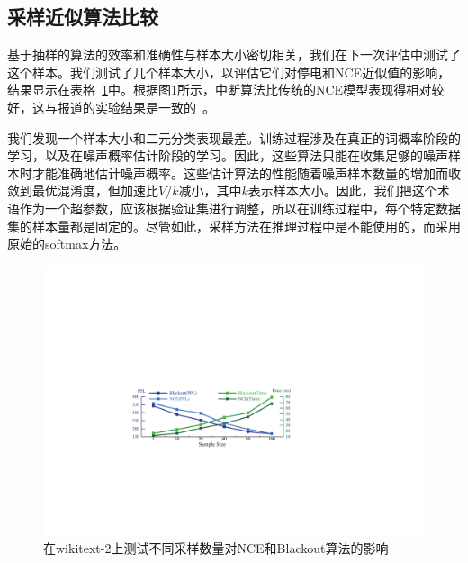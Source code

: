 \subsection{采样近似算法比较}

基于抽样的算法的效率和准确性与样本大小密切相关，我们在下一次评估中测试了这个样本。我们测试了几个样本大小，以评估它们对停电和NCE近似值的影响，结果显示在表格~\ref{fig:blackout_nce}中。根据图1所示，中断算法比传统的NCE模型表现得相对较好，这与报道的实验结果是一致的~\cite{DBLP:journals/iclr/JiVSAD15}。


我们发现一个样本大小和二元分类表现最差。训练过程涉及在真正的词概率阶段的学习，以及在噪声概率估计阶段的学习。因此，这些算法只能在收集足够的噪声样本时才能准确地估计噪声概率。这些估计算法的性能随着噪声样本数量的增加而收敛到最优混淆度，但加速比$ V / k $减小，其中$ k $表示样本大小。因此，我们把这个术语作为一个超参数，应该根据验证集进行调整，所以在训练过程中，每个特定数据集的样本量都是固定的。尽管如此，采样方法在推理过程中是不能使用的，而采用原始的softmax方法。
\begin{figure}[!ht]
  \centering
  \includegraphics[width=0.9\columnwidth]{./figures/nce_blackout.pdf}
  \caption{在wikitext-2上测试不同采样数量对NCE和Blackout算法的影响}\label{fig:blackout_nce}
\end{figure}

